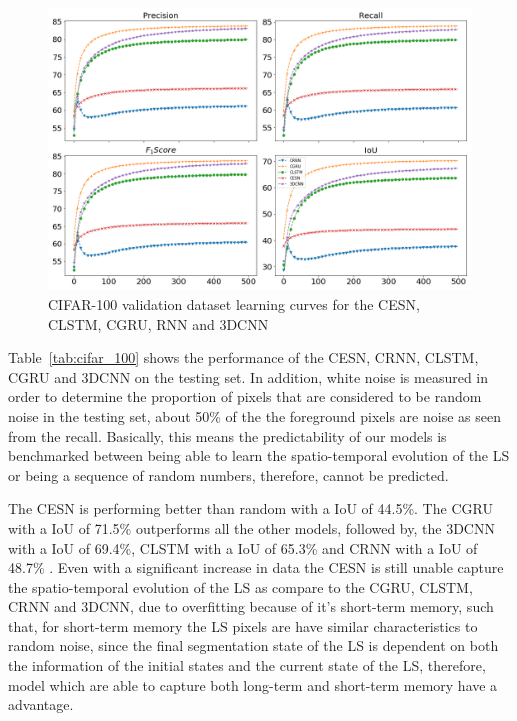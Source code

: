 \documentclass{WitsPhysicsReport}
\begin{document}
\begin{figure}[H]
\centering
  \includegraphics[width=1\textwidth]{Figure/Results/CIFAR_100_performance.png}
\caption{CIFAR-100 validation dataset learning curves for the CESN, CLSTM, CGRU, RNN and 3DCNN}
 \label{fig:cifar_100_model_perfomance}
\end{figure}


Table~\ref{tab:cifar_100} shows the performance of the CESN, CRNN, CLSTM, CGRU and 3DCNN on the testing set. In addition, white noise is measured in order to determine the proportion of pixels that are considered to be random noise in the testing set, about 50\% of the the foreground pixels are noise as seen from the recall. Basically, this means the predictability of our models is benchmarked between being able to learn the spatio-temporal evolution of the LS or being a sequence of random numbers, therefore, cannot be predicted.  

The CESN is performing better than random with a IoU of 44.5\%. The CGRU with a IoU of 71.5\% outperforms all the other models, followed by, the 3DCNN with a IoU of 69.4\%, CLSTM with a IoU of 65.3\% and CRNN with a IoU of 48.7\% . Even with a significant increase in data the CESN is still unable capture the spatio-temporal evolution of the LS as compare to the CGRU, CLSTM, CRNN and 3DCNN, due to overfitting  because of it's short-term memory, such that, for short-term memory the LS pixels are have similar characteristics to random noise, since the final segmentation state of the LS is dependent on both the information of the initial states and the current state of the LS, therefore, model which are able to capture both long-term and short-term memory have a advantage. 
\end{document}
